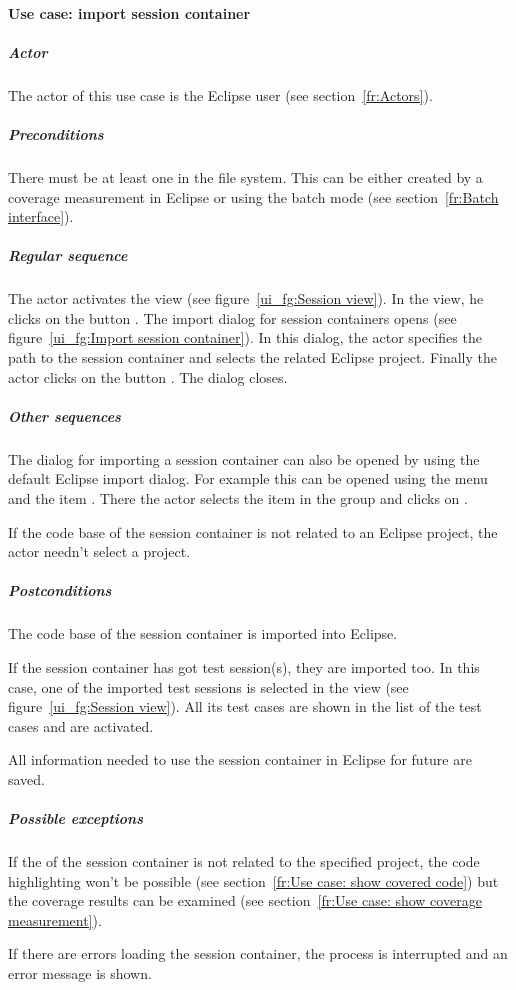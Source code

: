 \paragraph{Use case: import session container} \label{fr:Use case: import session container}
\subparagraph{Actor}
The actor of this use case is the Eclipse user (see section~\ref{fr:Actors}).
\subparagraph{Preconditions}
There must be at least one  in the file system. This can be either created by a coverage measurement in Eclipse or using the batch mode (see section~\ref{fr:Batch interface}).
\subparagraph{Regular sequence}
The actor activates the  view (see figure~\ref{ui_fg:Session view}). In the view, he clicks on the button . The import dialog for session containers opens (see figure~\ref{ui_fg:Import session container}). In this dialog, the actor specifies the path to the session container and selects the related Eclipse project. Finally the actor clicks on the button . The dialog closes.
\subparagraph{Other sequences}
The dialog for importing a session container can also be opened by using the default Eclipse import dialog. For example this can be opened using the menu  and the item . There the actor selects the item  in the group  and clicks on .
\par
If the code base of the session container is not related to an Eclipse project, the actor needn't select a project.
\subparagraph{Postconditions}
The code base of the session container is imported into Eclipse.
\par 
If the session container has got test session(s), they are imported too. In this case, one of the imported test sessions is selected in the  view (see figure~\ref{ui_fg:Session view}). All its test cases are shown in the list of the test cases and are activated.
\par
All information needed to use the session container in Eclipse for future are saved.
\subparagraph{Possible exceptions}
If the  of the session container is not related to the specified project, the code highlighting won't be possible (see section~\ref{fr:Use case: show covered code}) but the coverage results can be examined (see section~\ref{fr:Use case: show coverage measurement}).
\par
If there are errors loading the session container, the process is interrupted and an error message is shown.

